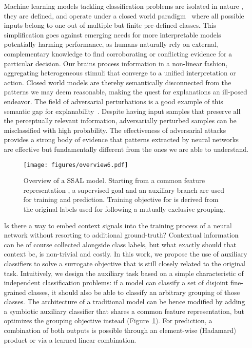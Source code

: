 \documentclass[10pt,twocolumn,letterpaper]{article}
\begin{document}
Machine learning models tackling classification problems are isolated in nature \ie, they are defined, and operate under a closed world paradigm~\cite{bendale2015towards} where all possible inputs belong to one out of multiple but finite pre-defined classes.
This simplification goes against emerging needs for more interpretable models~\cite{doshi2017towards,rudin2019stop} potentially harming performance, as humans naturally rely on external, complementary knowledge to find corroborating or conflicting evidence for a particular decision.
Our brains process information in a non-linear fashion, aggregating heterogeneous stimuli that converge to a unified interpretation or action.
Closed world models are thereby semantically disconnected from the patterns we may deem reasonable, making the quest for explanations an ill-posed endeavor.
The field of adversarial perturbations is a good example of this semantic gap for explanability~\cite{szegedy2013intriguing}.
Despite having input samples that preserve all the perceptually relevant information, adversarially perturbed samples can be misclassified with high probability.
The effectiveness of adversarial attacks provides a strong body of evidence that patterns extracted by neural networks are effective but fundamentally different from the ones we are able to understand.

\begin{figure}[t]
\centering
    \texttt{[image: figures/overview6.pdf]}
	\caption{Overview of a SSAL model. Starting from a common feature representation , a supervised goal  and an auxiliary branch  are used for training and prediction. Training objective for  is derived from the original labels used for  following a mutually exclusive grouping.}
	\label{fig:overview}
\end{figure}

Is there a way to embed context signals into the training process of a neural network without resorting to additional ground-truth?
Contextual information can be of course collected alongside class labels, but what exactly should that context be, is non-trivial and costly.
In this work, we propose the use of auxiliary classifiers to solve a surrogate objective that is still closely related to the original task.
Intuitively, we design the auxiliary task based on a simple characteristic of independent classification problems: if a model can classify a set of disjoint fine-grained classes, it should also be able to classify an arbitrary grouping of those classes.
The architecture of a traditional model can be hence modified by adding a symbiotic auxiliary classifier that shares a common feature representation, but optimizes the grouping objective instead (Figure~\ref{fig:overview}).
For prediction, a combination of both outputs is possible through an element-wise (Hadamard) product or via a learned linear combination.
\end{document}
